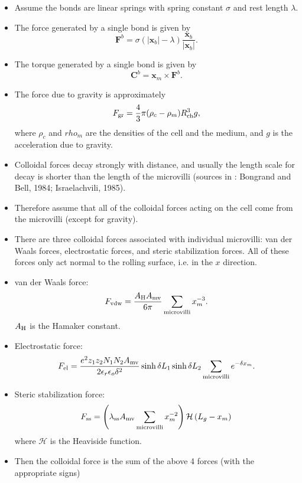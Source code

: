 \documentclass[
10pt, %
letterpaper, %
twocolumn, %
landscape %
]{article}
\newcommand{\mv}{\textnormal{mv}}
\newcommand{\ch}{\textnormal{ch}}
\newcommand{\x}{\mathbf{x}}
\begin{document}
\begin{itemize}
\item Assume the bonds are linear springs with spring constant $\sigma$ and
  rest length $\lambda$.
\item The force generated by a single bond is given by 
  \begin{equation}
    \label{eq:bond_forc}
    \mathbf{F}^b = \sigma (|\x_b| - \lambda) \frac{\x_b}{|\x_b|}.
  \end{equation}
\item The torque generated by a single bond is given by
  \begin{equation}
    \label{eq:bond_torq}
    \mathbf{C}^b = \x_m \times \mathbf{F}^b.
  \end{equation}
\item The force due to gravity is approximately
  \begin{equation}
    \label{eq:gravity}
    F_\textnormal{gr} = \frac{4}{3}\pi(\rho_c - \rho_m) R_\ch^3 g,
  \end{equation}
where $\rho_c$ and $rho_m$ are the densities of the cell and the
medium, and $g$ is the acceleration due to gravity.
\item Colloidal forces decay strongly with distance, and usually the
  length scale for decay is shorter than the length of the microvilli
  (sources in \cite{Hammer1992}: Bongrand and Bell, 1984;
  Israelachvili, 1985).
\item Therefore assume that all of the colloidal forces acting on the
  cell come from the microvilli (except for gravity).
\item There are three colloidal forces associated with individual
  microvilli: van der Waals forces, electrostatic forces, and steric
  stabilization forces. All of these forces only act normal to the
  rolling surface, i.e. in the $x$ direction.
\item van der Waals force:
  \begin{equation}
    \label{eq:vdw_forc}
    F_\textnormal{vdw} = \frac{A_\textnormal{H} A_\mv}{6\pi}
    \sum_\textnormal{microvilli} x_m^{-3}.
  \end{equation}
$A_\textnormal{H}$ is the Hamaker constant.
\item Electrostatic force:
  \begin{equation}
    \label{eq:elec_forc}
    F_\textnormal{el} = \frac{e^2 z_1 z_2 N_1 N_2 A_\mv}{2 \epsilon_r
      \epsilon_o \delta^2} \sinh \delta L_1 \sinh \delta L_2
    \sum_\textnormal{microvilli} e^{-\delta x_m}.
  \end{equation}
\item Steric stabilization force:
  \begin{equation}
    \label{eq:ster_forc}
    F_\textnormal{ss} = \left(\lambda_\textnormal{ss} A_\mv
    \sum_\textnormal{microvilli} x_m^{-2}\right) \mathcal{H}\left(L_g
    - x_m\right)
  \end{equation}
where $\mathcal{H}$ is the Heaviside function.
\item Then the colloidal force is the sum of the above 4 forces (with
  the appropriate signs)
\end{itemize}
\end{document}
